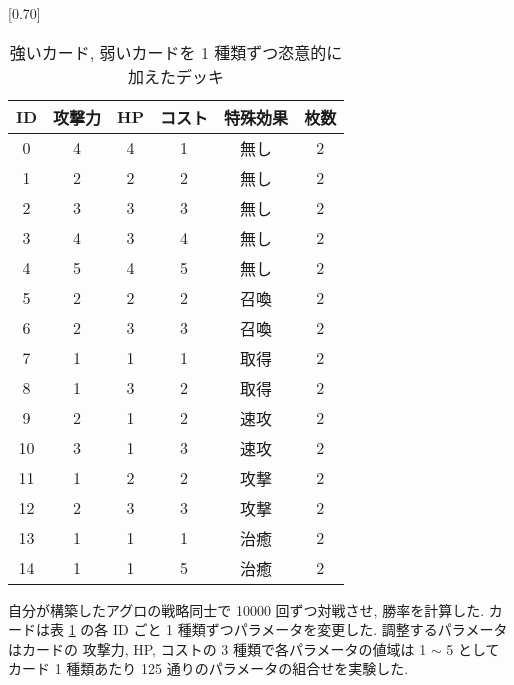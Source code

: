 \documentclass{jarticle}     %
\begin{document}
\begin{table}[ht]
  \centering
  \caption{強いカード, 弱いカードを 1 種類ずつ恣意的に加えたデッキ}
  \label{table:OPdeck}
  \vspace{-0.3cm}
  \scalebox{0.70}[0.70]{
    \begin{tabular}{|c|c|c|c|c|c|}
      \hline
      ID & 攻撃力 & HP & コスト & 特殊効果 & 枚数 \\ \hline
      0 & 4 & 4 & 1 & 無し & 2 \\ \hline
      1 & 2 & 2 & 2 & 無し & 2 \\ \hline
      2 & 3 & 3 & 3 & 無し & 2 \\ \hline
      3 & 4 & 3 & 4 & 無し & 2 \\ \hline
      4 & 5 & 4 & 5 & 無し & 2 \\ \hline
      5 & 2 & 2 & 2 & 召喚 & 2 \\ \hline
      6 & 2 & 3 & 3 & 召喚 & 2 \\ \hline
      7 & 1 & 1 & 1 & 取得 & 2 \\ \hline
      8 & 1 & 3 & 2 & 取得 & 2 \\ \hline
      9 & 2 & 1 & 2 & 速攻 & 2 \\ \hline
      10 & 3 & 1 & 3 & 速攻 & 2 \\ \hline
      11 & 1 & 2 & 2 & 攻撃 & 2 \\ \hline
      12 & 2 & 3 & 3 & 攻撃 & 2 \\ \hline
      13 & 1 & 1 & 1 & 治癒 & 2 \\ \hline
      14 & 1 & 1 & 5 & 治癒 & 2 \\ \hline
      \end{tabular}
  }
  
  \end{table}

  自分が構築したアグロの戦略同士で 10000 回ずつ対戦させ, 勝率を計算した.
  カードは表 \ref{table:OPdeck} の各 ID ごと 1 種類ずつパラメータを変更した. 調整するパラメータはカードの 攻撃力, HP, コストの 3 種類で各パラメータの値域は 1 $\sim$ 5 としてカード 1 種類あたり 125 通りのパラメータの組合せを実験した.
\end{document}
